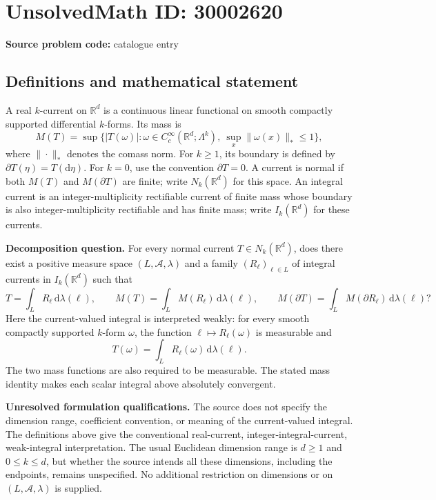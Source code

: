 \documentclass[11pt]{article}
\newcommand{\R}{\mathbb{R}}
\begin{document}
\section*{UnsolvedMath ID: 30002620}
\textbf{Source problem code:} catalogue entry
\subsection{Definitions and mathematical statement}
A real \(k\)-current on \(\R^d\) is a continuous linear functional on smooth compactly supported differential \(k\)-forms. Its mass is
\[
M(T)=\sup\bigl\{|T(\omega)|:\omega\in C_c^\infty(\R^d;\Lambda^k),\ \sup_x\|\omega(x)\|_*\leq 1\bigr\},
\]
where \(\|\cdot\|_*\) denotes the comass norm. For \(k\geq1\), its boundary is defined by \(\partial T(\eta)=T(\mathrm d\eta)\). For \(k=0\), use the convention \(\partial T=0\). A current is normal if both \(M(T)\) and \(M(\partial T)\) are finite; write \(N_k(\R^d)\) for this space. An integral current is an integer-multiplicity rectifiable current of finite mass whose boundary is also integer-multiplicity rectifiable and has finite mass; write \(I_k(\R^d)\) for these currents.

\textbf{Decomposition question.} For every normal current \(T\in N_k(\R^d)\), does there exist a positive measure space \((L,\mathcal A,\lambda)\) and a family \((R_\ell)_{\ell\in L}\) of integral currents in \(I_k(\R^d)\) such that
\[
T=\int_L R_\ell\,\mathrm d\lambda(\ell),\qquad
M(T)=\int_L M(R_\ell)\,\mathrm d\lambda(\ell),\qquad
M(\partial T)=\int_L M(\partial R_\ell)\,\mathrm d\lambda(\ell)?
\]
Here the current-valued integral is interpreted weakly: for every smooth compactly supported \(k\)-form \(\omega\), the function \(\ell\mapsto R_\ell(\omega)\) is measurable and
\[
T(\omega)=\int_L R_\ell(\omega)\,\mathrm d\lambda(\ell).
\]
The two mass functions are also required to be measurable. The stated mass identity makes each scalar integral above absolutely convergent.

\textbf{Unresolved formulation qualifications.} The source does not specify the dimension range, coefficient convention, or meaning of the current-valued integral. The definitions above give the conventional real-current, integer-integral-current, weak-integral interpretation. The usual Euclidean dimension range is \(d\geq1\) and \(0\leq k\leq d\), but whether the source intends all these dimensions, including the endpoints, remains unspecified. No additional restriction on dimensions or on \((L,\mathcal A,\lambda)\) is supplied.
\end{document}
